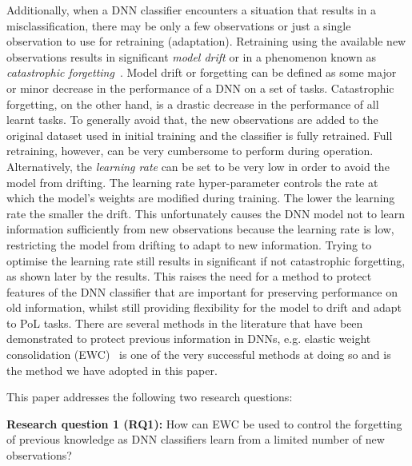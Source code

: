     Additionally, when a DNN classifier encounters a situation that results in a misclassification, there may be only a few observations or just a single observation to use for retraining (adaptation). 
    Retraining using the available new observations results in significant \textit{model drift} or in a phenomenon known as \textit{catastrophic forgetting}~\cite{Goodfellow2014}. Model drift or forgetting can be defined as some major or minor decrease in the performance of a DNN on a set of tasks. Catastrophic forgetting, on the other hand, is a drastic decrease in the performance of all learnt tasks.
    To generally avoid that, the new observations are added to the original dataset used in initial training and the classifier is fully retrained. 
    Full retraining, however, can be very cumbersome to perform during operation. 
    Alternatively, the \textit{learning rate} can be set to be very low in order to avoid the model from drifting. The learning rate hyper-parameter controls the rate at which the model's weights are modified during training.
    The lower the learning rate the smaller the drift.
    This unfortunately causes the DNN model not to learn information sufficiently from new observations because the learning rate is low, restricting the model from drifting to adapt to new information. 
    Trying to optimise the learning rate still results in significant if not catastrophic forgetting, as shown later by the results. 
    This raises the need for a method to protect features of the DNN classifier that are important for preserving performance on old information, whilst still providing flexibility for the model to drift and adapt to PoL tasks.
    There are several methods in the literature that have been demonstrated to protect previous information in DNNs, e.g. elastic weight consolidation (EWC)~\cite{Kirkpatrick2017} is one of the very successful methods at doing so and is the method we have adopted in this paper. 
    

This paper addresses the following two research questions:

\textbf{Research question 1 (RQ1):} How can EWC be used to control the forgetting of previous knowledge as DNN classifiers learn from a limited number of new observations?

